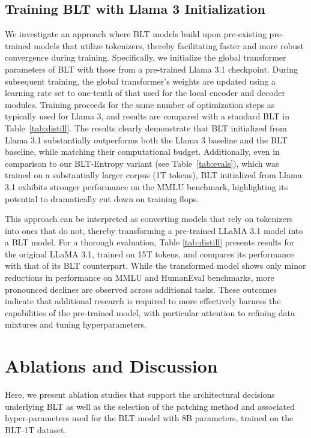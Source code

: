 \subsection{Training {\textsc BLT} with Llama 3 Initialization}
\label{sec:distillation}
We investigate an approach where {\textsc BLT} models build upon pre-existing pre-trained models that utilize tokenizers, thereby facilitating faster and more robust convergence during training. Specifically, we initialize the global transformer parameters of {\textsc BLT} with those from a pre-trained Llama 3.1 checkpoint. During subsequent training, the global transformer's weights are updated using a learning rate set to one-tenth of that used for the local encoder and decoder modules. Training proceeds for the same number of optimization steps as typically used for Llama 3, and results are compared with a standard {\textsc BLT} in Table~\ref{tab:distill}. The results clearly demonstrate that {\textsc BLT} initialized from Llama 3.1 substantially outperforms both the Llama 3 baseline and the {\textsc BLT} baseline, while matching their computational budget. Additionally, even in comparison to our {\textsc BLT}-Entropy variant (see Table~\ref{tab:evals}), which was trained on a substantially larger corpus (1T tokens), {\textsc BLT} initialized from Llama 3.1 exhibits stronger performance on the MMLU benchmark, highlighting its potential to dramatically cut down on training flops.

This approach can be interpreted as converting models that rely on tokenizers into ones that do not, thereby transforming a pre-trained LLaMA 3.1 model into a {\textsc BLT} model. For a thorough evaluation, Table \ref{tab:distill} presents results for the original LLaMA 3.1, trained on 15T tokens, and compares its performance with that of its {\textsc BLT} counterpart. While the transformed model shows only minor reductions in performance on MMLU and HumanEval benchmarks, more pronounced declines are observed across additional tasks. These outcomes indicate that additional research is required to more effectively harness the capabilities of the pre-trained model, with particular attention to refining data mixtures and tuning hyperparameters.

\section{Ablations and Discussion}
\label{section:ablations}
Here, we present ablation studies that support the architectural decisions underlying {\textsc BLT} as well as the selection of the patching method and associated hyper-parameters used for the {\textsc BLT} model with 8B parameters, trained on the {\textsc BLT}-1T dataset.

